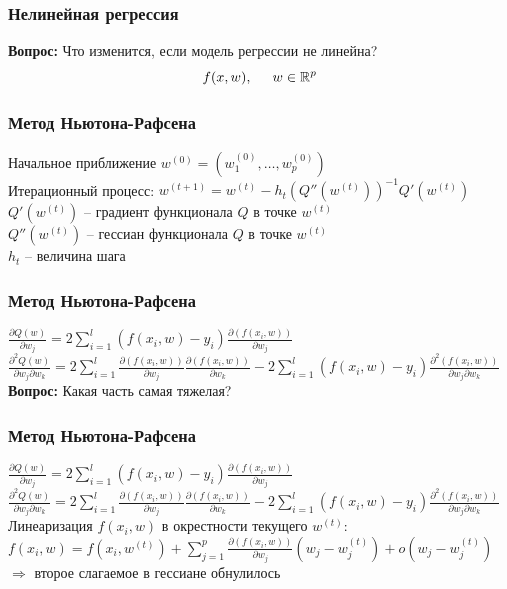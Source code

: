 \documentclass[12pt]{beamer}
\begin{document}
\begin{frame}\frametitle{Нелинейная регрессия}
\textbf{Вопрос:} Что изменится, если модель регрессии не линейна?\\
\vspace{5mm}
$$f(x, w), \hspace{5mm} w \in \mathbb{R}^p$$
\end{frame}


\begin{frame}\frametitle{Метод Ньютона-Рафсена}
Начальное приближение $w^{(0)} = (w_1^{(0)}, \dots, w_p^{(0)})$\\
Итерационный процесс: $w^{(t+1)} = w^{(t)} - h_t (Q''(w^{(t)}))^{-1}Q'(w^{(t)})$\\
\vspace{5mm}
$Q'(w^{(t)})$ -- градиент функционала $Q$ в точке $w^{(t)}$\\
$Q''(w^{(t)})$ -- гессиан функционала $Q$ в точке $w^{(t)}$\\
$h_t$ -- величина шага
\end{frame}

\begin{frame}\frametitle{Метод Ньютона-Рафсена}
$\frac{\partial Q(w)}{\partial w_j} = 2 \sum\limits_{i=1}^l (f(x_i, w) - y_i ) \frac{\partial(f(x_i, w))}{\partial w_j}$\\
$\frac{\partial^2 Q(w)}{\partial w_j \partial w_k} = 2 \sum\limits_{i=1}^l \frac{\partial(f(x_i, w))}{\partial w_j} \frac{\partial(f(x_i, w))}{\partial w_k} - 2 \sum\limits_{i=1}^l (f(x_i, w) - y_i ) \frac{\partial^2 (f(x_i, w))}{\partial w_j \partial w_k}$\\
\vspace{5mm}
\textbf{Вопрос:} Какая часть самая тяжелая?
\end{frame}

\begin{frame}\frametitle{Метод Ньютона-Рафсена}
$\frac{\partial Q(w)}{\partial w_j} = 2 \sum\limits_{i=1}^l (f(x_i, w) - y_i ) \frac{\partial(f(x_i, w))}{\partial w_j}$\\
$\frac{\partial^2 Q(w)}{\partial w_j \partial w_k} = 2 \sum\limits_{i=1}^l \frac{\partial(f(x_i, w))}{\partial w_j} \frac{\partial(f(x_i, w))}{\partial w_k} - 2 \sum\limits_{i=1}^l (f(x_i, w) - y_i ) \frac{\partial^2 (f(x_i, w))}{\partial w_j \partial w_k}$\\
\vspace{5mm}
Линеаризация $f(x_i, w)$ в окрестности текущего $w^{(t)}$:\\
$f(x_i, w) = f(x_i, w^{(t)}) + \sum\limits_{j=1}^p \frac{\partial(f(x_i, w))}{\partial w_j} (w_j - w_j^{(t)}) + o(w_j -w_j^{(t)})$\\
$\Rightarrow$ второе слагаемое в гессиане обнулилось
\end{frame}
\end{document}
